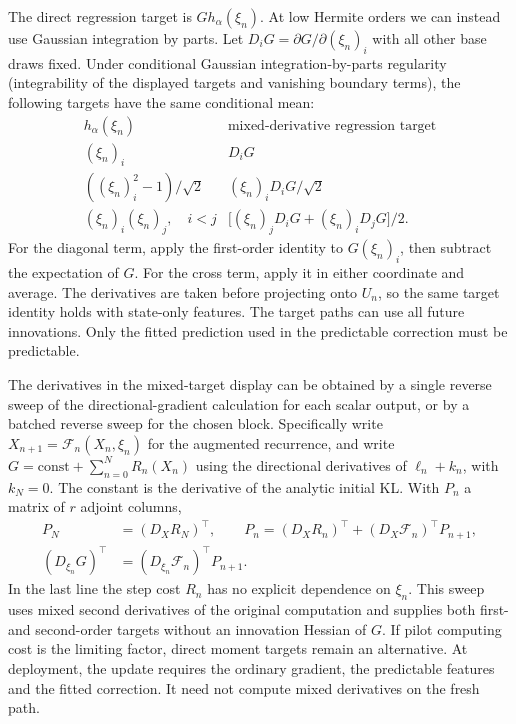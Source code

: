 \documentclass[12pt]{article}
\begin{document}
The direct regression target is \(G h_\alpha(\xi_n)\). At low Hermite orders we can instead use Gaussian integration by parts. Let \(D_i G=\partial G/\partial(\xi_n)_i\) with all other base draws fixed. Under conditional Gaussian integration-by-parts regularity (integrability of the displayed targets and vanishing boundary terms), the following targets have the same conditional mean:
\[
\begin{array}{c|c}
 h_\alpha(\xi_n) & \text{mixed-derivative regression target}\\ \hline
 (\xi_n)_i & D_iG\\[2pt]
 ((\xi_n)_i^2-1)/\sqrt{2} & (\xi_n)_i D_iG/\sqrt{2}\\[2pt]
 (\xi_n)_i(\xi_n)_j,\quad i<j &
 \bigl[(\xi_n)_j D_iG+(\xi_n)_i D_jG\bigr]/2 .
\end{array}
\]
For the diagonal term, apply the first-order identity to \(G(\xi_n)_i\), then subtract the expectation of \(G\). For the cross term, apply it in either coordinate and average. The derivatives are taken before projecting onto \(U_n\), so the same target identity holds with state-only features. The target paths can use all future innovations. Only the fitted prediction used in the predictable correction must be predictable.

The derivatives in the mixed-target display can be obtained by a single reverse sweep of the directional-gradient calculation for each scalar output, or by a batched reverse sweep for the chosen block. Specifically write \(X_{n+1}=\mathcal F_n(X_n,\xi_n)\) for the augmented recurrence, and write \(G=\mathrm{const}+\sum_{n=0}^N R_n(X_n)\) using the directional derivatives of \(\ell_n+k_n\), with \(k_N=0\). The constant is the derivative of the analytic initial KL. With \(P_n\) a matrix of \(r\) adjoint columns,
\[
 \begin{aligned}
 P_N&=(D_XR_N)^\top,\qquad
 P_n=(D_XR_n)^\top+(D_X\mathcal F_n)^\top P_{n+1},\\
 (D_{\xi_n}G)^\top&=(D_{\xi_n}\mathcal F_n)^\top P_{n+1}.
 \end{aligned}
\]
In the last line the step cost \(R_n\) has no explicit dependence on \(\xi_n\). This sweep uses mixed second derivatives of the original computation and supplies both first- and second-order targets without an innovation Hessian of \(G\). If pilot computing cost is the limiting factor, direct moment targets remain an alternative. At deployment, the update requires the ordinary gradient, the predictable features and the fitted correction. It need not compute mixed derivatives on the fresh path.
\end{document}
